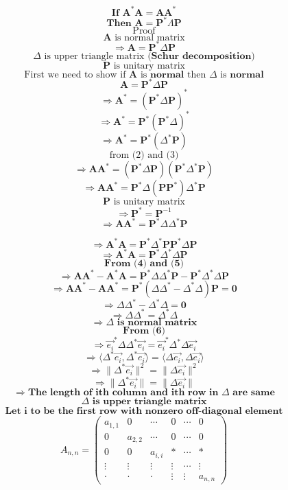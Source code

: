 \documentclass[10pt]{article}
\begin{document}
\[\textbf{If }\textbf{A}^\ast\textbf{A}=\textbf{A}\textbf{A}^\ast\]
\[\textbf{Then }\textbf{A}=\textbf{P}^\ast\Lambda\textbf{P}\]
\[\text{Proof}\]
\[\textbf{A}\text{ is normal matrix}\]
\[\Rightarrow\textbf{A} = \textbf{P}^\ast\Delta\textbf{P}\tag{1}\]
\[\Delta\text{ is upper triangle matrix }\textbf{(Schur decomposition)}\] 
\[\textbf{P}\text{ is unitary matrix}\]
\[\text{First we need to show if }\textbf{A}\text{ is }\textbf{normal}\text{ then }\Delta\text{ is }\textbf{normal}\tag{2}\]
\[\textbf{A} = \textbf{P}^\ast\Delta\textbf{P}\]
\[\Rightarrow\textbf{A}^\ast = (\textbf{P}^\ast\Delta\textbf{P})^\ast\]
\[\Rightarrow\textbf{A}^\ast = \textbf{P}^\ast(\textbf{P}^\ast\Delta)^\ast\]
\[\Rightarrow\textbf{A}^\ast = \textbf{P}^\ast(\Delta^\ast\textbf{P})\tag{3}\]
\[\text{from (2) and (3)}\]
\[\Rightarrow\textbf{A}\textbf{A}^\ast = (\textbf{P}^\ast\Delta\textbf{P})(\textbf{P}^\ast\Delta^\ast\textbf{P})\]
\[\Rightarrow\textbf{A}\textbf{A}^\ast = \textbf{P}^\ast\Delta(\textbf{P}\textbf{P}^\ast)\Delta^\ast\textbf{P}\]
\[\textbf{P} \text{ is unitary matrix}\]
\[\Rightarrow\textbf{P}^\ast = \textbf{P}^{-1}\]
\[\Rightarrow\textbf{A}\textbf{A}^\ast = \textbf{P}^\ast\Delta\Delta^\ast\textbf{P}\tag{4}\]

\[\Rightarrow\textbf{A}^\ast\textbf{A} = \textbf{P}^\ast\Delta^\ast\textbf{P}\textbf{P}^\ast\Delta\textbf{P}\]
\[\Rightarrow\textbf{A}^\ast\textbf{A} = \textbf{P}^\ast\Delta^\ast\Delta\textbf{P}\tag{5}\]
\[\textbf{From (4) and (5)}\]
\[\Rightarrow\textbf{A}\textbf{A}^\ast - \textbf{A}^\ast\textbf{A} = \textbf{P}^\ast\Delta\Delta^\ast\textbf{P}-\textbf{P}^\ast\Delta^\ast\Delta\textbf{P}\]
\[\Rightarrow\textbf{A}\textbf{A}^\ast - \textbf{A}\textbf{A}^\ast = \textbf{P}^\ast(\Delta\Delta^\ast-\Delta^\ast\Delta)\textbf{P} = \textbf{0}\]
\[\Rightarrow \Delta\Delta^\ast-\Delta^\ast\Delta = \textbf{0}\]
\[\Rightarrow\Delta\Delta^\ast = \Delta^\ast\Delta\tag{6}\]
\[\Rightarrow\Delta \textbf{ is normal matrix}\]
\[\textbf{From (6)}\]
\[\Rightarrow\vec{e_i}^\ast\Delta\Delta^\ast\vec{e_i} = \vec{e_i}^\ast\Delta^\ast\Delta\vec{e_i}\]
\[\Rightarrow\langle\Delta^\ast\vec{e_i},\Delta^\ast\vec{e_i}\rangle = \langle\Delta\vec{e_i}, \Delta\vec{e_i}\rangle\]
\[\Rightarrow\lVert\Delta^\ast\vec{e_i}\rVert^{2} = \lVert\Delta\vec{e_i}\lVert^{2}\]
\[\Rightarrow\lVert\Delta^\ast\vec{e_i}\rVert = \rVert\Delta\vec{e_i}\lVert\]
\[\Rightarrow\textbf{The length of ith column and ith row in }\Delta\textbf{ are same} \tag{7}\]
\[\Delta\textbf{ is upper triangle matrix}\]
\[\textbf{Let i to be the first row with nonzero off-diagonal element}\]
\[
A_{n,n} = 
\begin{pmatrix}
a_{1,1}     &     0     & \cdots & 0      & \cdots & 0      \\
   0        & a_{2, 2}  & \cdots & 0      & \cdots & 0      \\
   0        &     0     & a_{i,i}& \ast   & \cdots & \ast   \\
\vdots      &   \vdots  & \vdots & \vdots & \cdots & \vdots \\
   \cdot    &    \cdot  & \cdot  & \vdots & \vdots & a_{n,n}
\end{pmatrix}
\]
\end{document}
